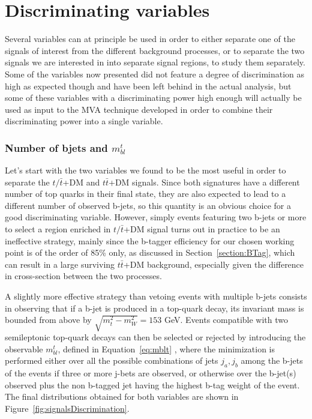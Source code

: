 \documentclass[a4paper, 10pt, openright]{report}
\begin{document}
\section{Discriminating variables} \label{section:Variables}

Several variables can at principle be used in order to either separate one of the signals of interest from the different background processes, or to separate the two signals we are interested in into separate signal regions, to study them separately. Some of the variables now presented did not feature a degree of discrimination as high as expected though and have been left behind in the actual analysis, but some of these variables with a discriminating power high enough will actually be used as input to the \ac{MVA} technique developed in order to combine their discriminating power into a single variable.

\subsubsection*{Number of bjets and $m_{bl}^t$}

Let's start with the two variables we found to be the most useful in order to separate the $t/\bar t$+DM and $t \bar t$+DM signals. Since both signatures have a different number of top quarks in their final state, they are also expected to lead to a different number of observed b-jets, so this quantity is an obvious choice for a good discriminating variable. However, simply events featuring two b-jets or more to select a region enriched in $t/ \bar t$+DM signal turns out in practice to be an ineffective strategy, mainly since the b-tagger efficiency for our chosen working point is of the order of 85\% only, as discussed in Section~\ref{section:BTag}, which can result in a large surviving $t \bar t$+DM background, especially given the difference in cross-section between the two processes.

A slightly more effective strategy than vetoing events with multiple b-jets consists in observing that if a b-jet is produced in a top-quark decay, its invariant mass is bounded from above by $\sqrt{m_t^2 - m_{W}^2} = 153$ GeV. Events compatible with two semileptonic top-quark decays can then be selected or rejected by introducing the observable $m_{bl}^t$, defined in Equation~\ref{eq:mblt} \cite{mblt}, where the minimization is performed either over all the possible combinations of jets {$j_a, j_b$} among the b-jets of the events if three or more j-bets are observed, or otherwise over the b-jet(s) observed plus the non b-tagged jet having the highest b-tag weight of the event. The final distributions obtained for both variables are shown in Figure~\ref{fig:signalsDiscrimination}.
\end{document}
